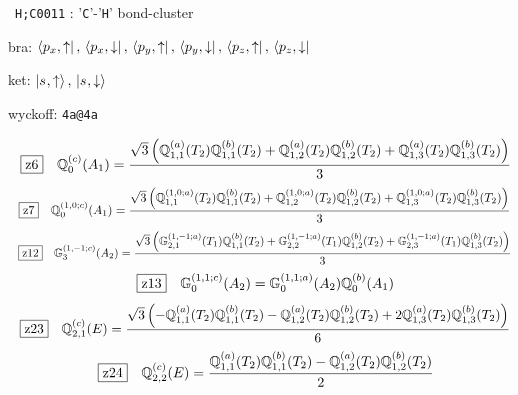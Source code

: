 \documentclass[fleqn,10pt,landscape]{jsarticle}
\begin{document}
\noindent\textbullet\, \texttt{H;C\texttt{}001\texttt{}1} : '\texttt{C}'-'\texttt{H}' bond-cluster

\noindent\quad * bra: $\bra{p_{x},\uparrow},\, \bra{p_{x},\downarrow},\, \bra{p_{y},\uparrow},\, \bra{p_{y},\downarrow},\, \bra{p_{z},\uparrow},\, \bra{p_{z},\downarrow}$

\noindent\quad * ket: $\ket{s_{},\uparrow},\, \ket{s_{},\downarrow}$

\noindent\quad * wyckoff: \texttt{4a@4a}

\begin{dmath*}
\hspace*{3mm}\fbox{z6}\quad \mathbb{Q}_{0}^{(c)}(A_{1})=\frac{\sqrt{3} \left(\mathbb{Q}_{1,1}^{(a)}(T_{2}) \mathbb{Q}_{1,1}^{(b)}(T_{2}) + \mathbb{Q}_{1,2}^{(a)}(T_{2}) \mathbb{Q}_{1,2}^{(b)}(T_{2}) + \mathbb{Q}_{1,3}^{(a)}(T_{2}) \mathbb{Q}_{1,3}^{(b)}(T_{2})\right)}{3}
\end{dmath*}
\begin{dmath*}
\hspace*{3mm}\fbox{z7}\quad \mathbb{Q}_{0}^{(1,0;c)}(A_{1})=\frac{\sqrt{3} \left(\mathbb{Q}_{1,1}^{(1,0;a)}(T_{2}) \mathbb{Q}_{1,1}^{(b)}(T_{2}) + \mathbb{Q}_{1,2}^{(1,0;a)}(T_{2}) \mathbb{Q}_{1,2}^{(b)}(T_{2}) + \mathbb{Q}_{1,3}^{(1,0;a)}(T_{2}) \mathbb{Q}_{1,3}^{(b)}(T_{2})\right)}{3}
\end{dmath*}
\begin{dmath*}
\hspace*{3mm}\fbox{z12}\quad \mathbb{G}_{3}^{(1,-1;c)}(A_{2})=\frac{\sqrt{3} \left(\mathbb{G}_{2,1}^{(1,-1;a)}(T_{1}) \mathbb{Q}_{1,1}^{(b)}(T_{2}) + \mathbb{G}_{2,2}^{(1,-1;a)}(T_{1}) \mathbb{Q}_{1,2}^{(b)}(T_{2}) + \mathbb{G}_{2,3}^{(1,-1;a)}(T_{1}) \mathbb{Q}_{1,3}^{(b)}(T_{2})\right)}{3}
\end{dmath*}
\begin{dmath*}
\hspace*{3mm}\fbox{z13}\quad \mathbb{G}_{0}^{(1,1;c)}(A_{2})=\mathbb{G}_{0}^{(1,1;a)}(A_{2}) \mathbb{Q}_{0}^{(b)}(A_{1})
\end{dmath*}
\begin{dmath*}
\hspace*{3mm}\fbox{z23}\quad \mathbb{Q}_{2,1}^{(c)}(E)=\frac{\sqrt{3} \left(- \mathbb{Q}_{1,1}^{(a)}(T_{2}) \mathbb{Q}_{1,1}^{(b)}(T_{2}) - \mathbb{Q}_{1,2}^{(a)}(T_{2}) \mathbb{Q}_{1,2}^{(b)}(T_{2}) + 2 \mathbb{Q}_{1,3}^{(a)}(T_{2}) \mathbb{Q}_{1,3}^{(b)}(T_{2})\right)}{6}
\end{dmath*}
\begin{dmath*}
\hspace*{3mm}\fbox{z24}\quad \mathbb{Q}_{2,2}^{(c)}(E)=\frac{\mathbb{Q}_{1,1}^{(a)}(T_{2}) \mathbb{Q}_{1,1}^{(b)}(T_{2}) - \mathbb{Q}_{1,2}^{(a)}(T_{2}) \mathbb{Q}_{1,2}^{(b)}(T_{2})}{2}
\end{dmath*}
\end{document}
